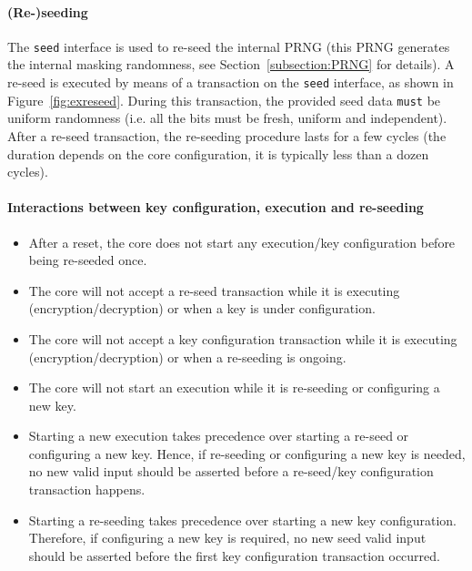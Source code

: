 \documentclass{scrartcl}
\begin{document}
\paragraph{(Re-)seeding}

The \texttt{seed} interface is used to re-seed the internal PRNG (this
PRNG generates the internal masking randomness, see
Section~\ref{subsection:PRNG} for details).
A re-seed is executed by means of a transaction on the \texttt{seed} interface,
as shown in Figure~\ref{fig:exreseed}.
During this transaction, the provided seed data \texttt{must} be uniform
randomness (i.e. all the bits must be fresh, uniform and independent).
After a re-seed transaction, the re-seeding procedure lasts for a few cycles (the
duration depends on the core configuration, it is typically less than a dozen
cycles). 

\paragraph{Interactions between key configuration, execution and re-seeding}
\begin{itemize}
    \item After a reset, the core does not start any execution/key configuration before being re-seeded once. 
    \item The core will not accept a re-seed transaction while it is executing (encryption/decryption) or when a key is under configuration.
    \item The core will not accept a key configuration transaction while it is executing (encryption/decryption) or when a re-seeding is ongoing.
    \item The core will not start an execution while it is re-seeding or configuring a new key.
    \item Starting a new execution takes precedence over starting a re-seed or configuring a new key.
        Hence, if re-seeding or configuring a new key is needed, no new valid input should be asserted
        before a re-seed/key configuration transaction happens.
    \item Starting a re-seeding takes precedence over starting a new key configuration. Therefore, if configuring a new key is required, no new 
        seed valid input should be asserted before the first key configuration transaction occurred.
\end{itemize}
\end{document}
